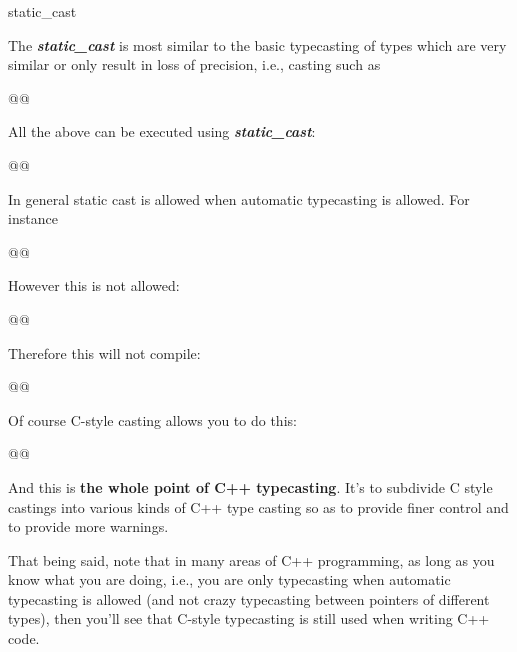 \documentclass[
]{article}
\begin{document}
static\_cast

The \emph{\textbf{static\_cast}} is most similar to the basic
typecasting of types which are very similar or only result in loss of
precision, i.e., casting such as

\begin{longtable}[]{@{}@{}}
\toprule\noalign{}
\endhead
\bottomrule\noalign{}
\endlastfoot
\end{longtable}

All the above can be executed using \emph{\textbf{static\_cast}}:

\begin{longtable}[]{@{}@{}}
\toprule\noalign{}
\endhead
\bottomrule\noalign{}
\endlastfoot
\end{longtable}

In general static cast is allowed when automatic typecasting is allowed.
For instance

\begin{longtable}[]{@{}@{}}
\toprule\noalign{}
\endhead
\bottomrule\noalign{}
\endlastfoot
\end{longtable}

However this is not allowed:

\begin{longtable}[]{@{}@{}}
\toprule\noalign{}
\endhead
\bottomrule\noalign{}
\endlastfoot
\end{longtable}

Therefore this will not compile:

\begin{longtable}[]{@{}@{}}
\toprule\noalign{}
\endhead
\bottomrule\noalign{}
\endlastfoot
\end{longtable}

Of course C-style casting allows you to do this:

\begin{longtable}[]{@{}@{}}
\toprule\noalign{}
\endhead
\bottomrule\noalign{}
\endlastfoot
\end{longtable}

And this is \textbf{the whole point of C++ typecasting}. It's to
subdivide C style castings into various kinds of C++ type casting so as
to provide finer control and to provide more warnings.

That being said, note that in many areas of C++ programming, as long as
you know what you are doing, i.e., you are only typecasting when
automatic typecasting is allowed (and not crazy typecasting between
pointers of different types), then you'll see that C-style typecasting
is still used when writing C++ code.
\end{document}
